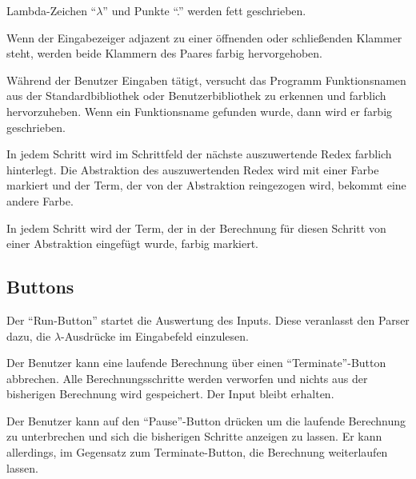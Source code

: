 \documentclass[parskip=full,11pt,twoside]{scrartcl}
\begin{document}
Lambda-Zeichen \enquote{$\lambda$} und Punkte \enquote{.} werden fett geschrieben.

Wenn der Eingabezeiger adjazent zu einer öffnenden oder schließenden Klammer steht, werden beide Klammern des Paares farbig hervorgehoben.

Während der Benutzer Eingaben tätigt, versucht das Programm Funktionsnamen aus der Standardbibliothek oder Benutzerbibliothek zu erkennen und farblich hervorzuheben. Wenn ein Funktionsname gefunden wurde, dann wird er farbig geschrieben.

In jedem Schritt wird im Schrittfeld der nächste auszuwertende Redex farblich hinterlegt.
Die Abstraktion des auszuwertenden Redex wird mit einer Farbe markiert und der Term, der von der Abstraktion reingezogen wird, bekommt eine andere Farbe.

In jedem Schritt wird der Term, der in der Berechnung für diesen Schritt von einer Abstraktion eingefügt wurde, farbig markiert.


\subsection{Buttons}

Der \enquote{Run-Button} startet die Auswertung des Inputs. Diese veranlasst den Parser dazu, die $\lambda$-Ausdrücke im Eingabefeld einzulesen.

Der Benutzer kann eine laufende Berechnung über einen \enquote{Terminate}-Button abbrechen. Alle Berechnungsschritte werden verworfen und nichts aus der bisherigen Berechnung wird gespeichert. Der Input bleibt erhalten.

Der Benutzer kann auf den \enquote{Pause}-Button drücken um die laufende Berechnung zu unterbrechen und sich die bisherigen Schritte anzeigen zu lassen. Er kann allerdings, im Gegensatz zum Terminate-Button, die Berechnung weiterlaufen lassen.
\end{document}
